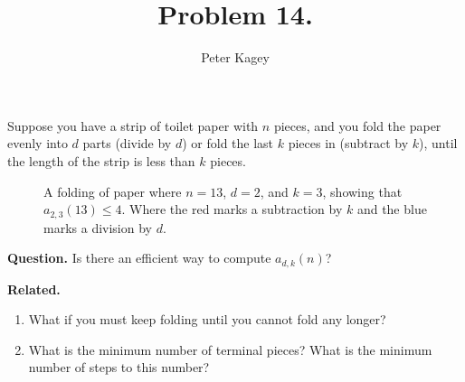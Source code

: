 \documentclass{article}
\newenvironment{question}{\begin{trivlist}\item[\textbf{Question.}]}{\end{trivlist}}
\newenvironment{related}{\begin{trivlist}\item[\textbf{Related.}]\end{trivlist}\begin{enumerate}}{\end{enumerate}}
\begin{document}
\title{Problem 14.}
\date{}
\author{Peter Kagey}
\maketitle
  Suppose you have a strip of toilet paper with $n$ pieces, and you fold the
  paper evenly into $d$ parts (divide by $d$) or fold the last $k$ pieces in
  (subtract by $k$), until the length of the strip is less than $k$ pieces.
\begin{figure}[!h]
  \centering
  \caption{
    A folding of paper where $n = 13$, $d = 2$, and $k = 3$, showing that
    $a_{2,3}(13) \leq 4$.
    Where the red marks a subtraction by $k$ and the blue marks a division by $d$.
  }
\end{figure}

\begin{question}
  Is there an efficient way to compute $a_{d,k}(n)$?
\end{question}

\begin{related}
  \item What if you must keep folding until you cannot fold any longer?
  \item What is the minimum number of terminal pieces? What is the minimum number of steps to this number?
\end{related}
\end{document}
